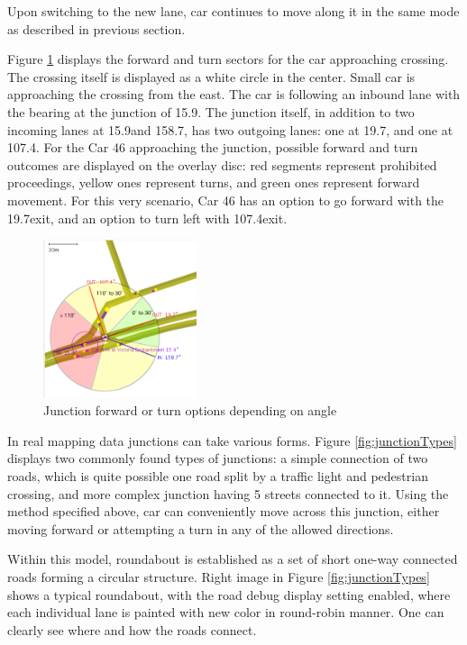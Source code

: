 Upon switching to the new lane, car continues to move along it in the same mode as described in previous section.

Figure \ref{fig:forwardOrTurnOption} displays the forward and turn sectors for the car approaching crossing. The crossing itself is displayed as a white circle in the center. Small car is approaching the crossing from the east. The car is following an inbound lane with the bearing at the junction of 15.9\degspc. The junction itself, in addition to two incoming lanes at 15.9\degspc and 158.7\degspc, has two outgoing lanes: one at 19.7\degspc, and one at 107.4\degspc. For the Car 46 approaching the junction, possible forward and turn outcomes are displayed on the overlay disc: red segments represent prohibited proceedings, yellow ones represent turns, and green ones represent forward movement. For this very scenario, Car 46 has an option to go forward with the 19.7\degspc exit, and an option to turn left with 107.4\degspc exit.

\begin{figure}[H]
    \vspace{1.5em}
    \caption{Junction forward or turn options depending on angle }
    \label{fig:forwardOrTurnOption}
    \centering
    \includegraphics[width=0.4\textwidth]{figs/junction/junction_car_incoming_angle_with_turn_sectors.png}
    \vspace{1.5em}
\end{figure}

In real mapping data junctions can take various forms. Figure \ref{fig:junctionTypes} displays two commonly found types of junctions: a simple connection of two roads, which is quite possible one road split by a traffic light and pedestrian crossing, and more complex junction having 5 streets connected to it. Using the method specified above, car can conveniently move across this junction, either moving forward or attempting a turn in any of the allowed directions.

Within this model, roundabout is established as a set of short one-way connected roads forming a circular structure. Right image in Figure \ref{fig:junctionTypes} shows a typical roundabout, with the road debug display setting enabled, where each individual lane is painted with new color in round-robin manner. One can clearly see where and how the roads connect.

